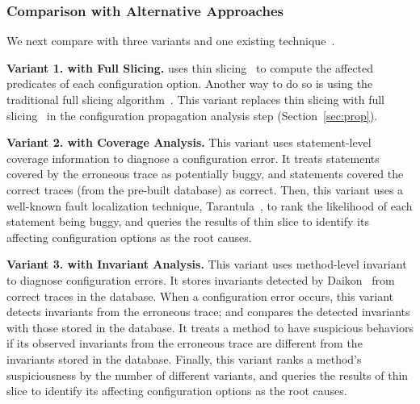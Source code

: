 \subsubsection{Comparison with Alternative Approaches}
\label{sec:comparison}

We next compare \ourtool with three variants and
one existing technique~\cite{Rabkin:2011:PPC}.

\vspace{1mm}
\noindent \textbf{Variant 1. \ourtool with Full Slicing.} 
\ourtool uses thin slicing~\cite{Sridharan:2007} to compute the affected predicates
of each configuration option. Another way to do so is
using the traditional full slicing algorithm~\cite{Horwitz:1988}.
This variant replaces thin slicing with 
full slicing~\cite{Horwitz:1988} in the configuration
propagation analysis step (Section~\ref{sec:prop}).


\vspace{1mm}
\noindent \textbf{Variant 2. \ourtool with Coverage Analysis.}
This variant uses statement-level coverage information
to diagnose a configuration error. It treats statements covered
by the erroneous trace as potentially buggy, and statements
covered the correct traces (from the pre-built database) as correct.
Then, this variant uses a well-known fault localization technique,
Tarantula~\cite{Jones:2002}, to rank the likelihood of each
statement being buggy, and queries the results of thin slice
to identify its affecting configuration options as the root causes. 


\vspace{1mm}
\noindent \textbf{Variant 3. \ourtool with Invariant Analysis.}
This variant uses method-level invariant
to diagnose configuration errors. It stores invariants detected
by Daikon~\cite{Ernst:1999} from correct traces in the database. When a configuration
error occurs, this variant detects invariants from the erroneous trace;
and compares the detected invariants
with those stored in the database.
It treats a method to have suspicious behaviors if its observed invariants
from the erroneous trace are different from the invariants stored in the database. Finally, this variant ranks
a method's suspiciousness by the number of different variants, and
queries the results of thin slice
to identify its affecting configuration options as the root causes. 

